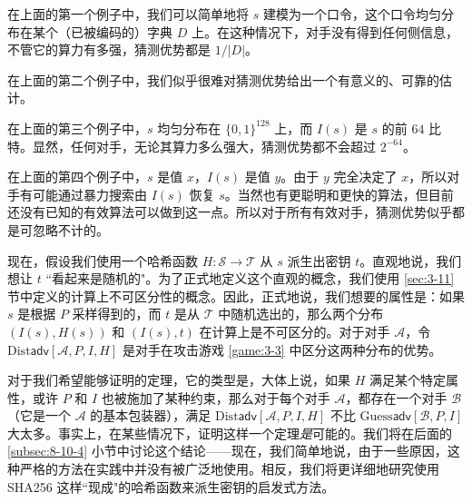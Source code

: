在上面的第一个例子中，我们可以简单地将 $s$ 建模为一个口令，这个口令均匀分布在某个（已被编码的）字典 $D$ 上。在这种情况下，对手没有得到任何侧信息，不管它的算力有多强，猜测优势都是 $1/|D|$。

在上面的第二个例子中，我们似乎很难对猜测优势给出一个有意义的、可靠的估计。

在上面的第三个例子中，$s$ 均匀分布在 $\{0,1\}^{128}$ 上，而 $I(s)$ 是 $s$ 的前 $64$ 比特。显然，任何对手，无论其算力多么强大，猜测优势都不会超过 $2^{-64}$。

在上面的第四个例子中，$s$ 是值 $x$，$I(s)$ 是值 $y$。由于 $y$ 完全决定了 $x$，所以对手有可能通过暴力搜索由 $I(s)$ 恢复 $s$。当然也有更聪明和更快的算法，但目前还没有已知的有效算法可以做到这一点。所以对于所有有效对手，猜测优势似乎都是可忽略不计的。

现在，假设我们使用一个哈希函数 $H:\mathcal{S}\to\mathcal{T}$ 从 $s$ 派生出密钥 $t$。直观地说，我们想让 $t$ ``看起来是随机的"。为了正式地定义这个直观的概念，我们使用 \ref{sec:3-11} 节中定义的计算上不可区分性的概念。因此，正式地说，我们想要的属性是：如果 $s$ 是根据 $P$ 采样得到的，而 $t$ 是从 $\mathcal{T}$ 中随机选出的，那么两个分布 $(I(s),H(s))$ 和 $(I(s),t)$ 在计算上是不可区分的。对于对手 $\mathcal{A}$，令 $\mathrm{Dist}\mathsf{adv}[\mathcal{A},P,I,H]$ 是对手在攻击游戏 \ref{game:3-3} 中区分这两种分布的优势。

对于我们希望能够证明的定理，它的类型是，大体上说，如果 $H$ 满足某个特定属性，或许 $P$ 和 $I$ 也被施加了某种约束，那么对于每个对手 $\mathcal{A}$，都存在一个对手 $\mathcal{B}$（它是一个 $\mathcal{A}$ 的基本包装器），满足 $\mathrm{Dist}\mathsf{adv}[\mathcal{A},P,I,H]$ 不比 $\mathrm{Guess}\mathsf{adv}[\mathcal{B},P,I]$ 大太多。事实上，在某些情况下，证明这样一个定理\emph{是}可能的。我们将在后面的 \ref{subsec:8-10-4} 小节中讨论这个结论——现在，我们简单地说，由于一些原因，这种严格的方法在实践中并没有被广泛地使用。相反，我们将更详细地研究使用 SHA256 这样``现成"的哈希函数来派生密钥的启发式方法。

